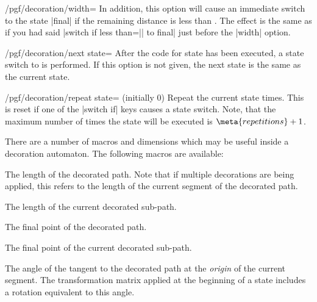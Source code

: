 \begin{command}{\pgfdeclaredecoration{}}
\begin{command}{\state{}}
\begin{key}{/pgf/decoration/width=}
      In addition, this option will cause an immediate switch to the
      state |final| if the remaining distance is less than
      . The effect is the same as if you had said
      |switch if less than=|| to final| just before
      the |width| option.
    \end{key}
    \begin{key}{/pgf/decoration/next state=}
      After the code for state has been executed, a state switch to
       is performed. If this option is not given, the
      next state is the same as the current state.
    \end{key}
    \begin{key}{/pgf/decoration/repeat state= (initially 0)}
      Repeat the current state  times. This is reset
      if one of the |switch if| keys causes a state switch. 
      Note, that the maximum number of times the state will be executed 
      is $\meta{repetitions}+1$.
    \end{key}
    
		There are a number of macros and dimensions which may be useful
		inside a decoration automaton. The following macros are available:
		
		\begin{command}{\pgfdecoratedpathlength}
				The length of the decorated path. Note that if multiple
				decorations are being applied, this refers to the length
				of the current segment of the decorated path.
		\end{command}
		
		\begin{command}{\pgfdecoratedsubpathlength}
				The length of the current decorated sub-path.
		\end{command}
		
		\begin{command}{\pgfpointdecoratedpathlast}
				The final point of the decorated path.
		\end{command}
				
		\begin{command}{\pgfpointdecoratedsubpathlast}
				The final point of the current decorated sub-path.
		\end{command}
		
		\begin{command}{\pgfdecoratedangle}
		   The angle of the tangent to the decorated path at the \emph{origin}
		   of the current segment. The transformation matrix applied at 
		   the beginning of a state includes a rotation equivalent to 
		   this angle.
		\end{command}
		

\end{command}
\end{command}
